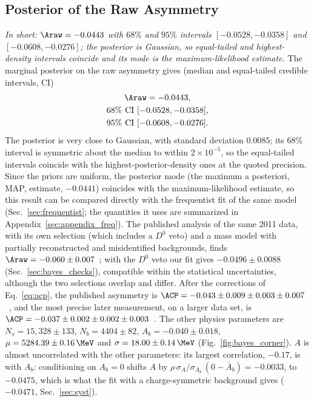 \subsection{Posterior of the Raw Asymmetry}
\emph{In short: $\Araw=-0.0443$ with $68\%$ and $95\%$ intervals $[-0.0528,-0.0358]$ and $[-0.0608,-0.0276]$; the posterior is Gaussian, so equal-tailed and highest-density intervals coincide and its mode is the maximum-likelihood estimate.}
The marginal posterior on the raw asymmetry gives (median and equal-tailed credible intervals, CI)
\begin{gather*}
\Araw = -0.0443, \\
68\%~\text{CI}~[-0.0528,-0.0358], \\ 95\%~\text{CI}~[-0.0608,-0.0276].
\end{gather*}
The posterior is very close to Gaussian, with standard deviation $0.0085$; its 68\% interval is symmetric about the median to within $2\times10^{-5}$, so the equal-tailed intervals coincide with the highest-posterior-density ones at the quoted precision. Since the priors are uniform, the posterior mode (the maximum a posteriori, MAP, estimate, $-0.0441$) coincides with the maximum-likelihood estimate, so this result can be compared directly with the frequentist fit of the same model (Sec.~\ref{sec:frequentist}; the quantities it uses are summarized in Appendix~\ref{sec:appendix_freq}). The published analysis of the same 2011 data, with its own selection (which includes a $D^0$ veto) and a mass model with partially reconstructed and misidentified backgrounds, finds $\Araw=-0.060\pm0.007$~\cite{lhcb_cpv_2013}; with the $D^0$ veto our fit gives $-0.0496\pm0.0088$ (Sec.~\ref{sec:bayes_checks}), compatible within the statistical uncertainties, although the two selections overlap and differ. After the corrections of Eq.~\eqref{eq:acp}, the published asymmetry is $\ACP=-0.043\pm0.009\pm0.003\pm0.007$~\cite{lhcb_cpv_2013}, and the most precise later measurement, on a larger data set, is $\ACP=-0.037\pm0.002\pm0.002\pm0.003$~\cite{lhcb_cpv_prd2023,lhcb_cpv_paper}. The other physics parameters are $N_s=15{,}328\pm133$, $N_b=4404\pm82$, $A_b=-0.040\pm0.018$, $\mu=5284.39\pm0.16\,\MeV$ and $\sigma=18.00\pm0.14\,\MeV$ (Fig.~\ref{fig:bayes_corner}). $A$ is almost uncorrelated with the other parameters: its largest correlation, $-0.17$, is with $A_b$: conditioning on $A_b=0$ shifts $A$ by $\rho\,\sigma_A/\sigma_{A_b}\,(0-\bar A_b)=-0.0033$, to $-0.0475$, which is what the fit with a charge-symmetric background gives ($-0.0471$, Sec.~\ref{sec:syst}).

